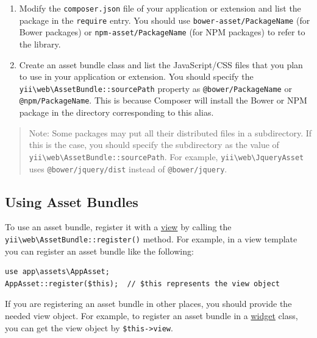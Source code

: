 \begin{enumerate}
\item Modify the \lstinline|composer.json| file of your application or extension and list the package in the \lstinline|require| entry.
You should use \lstinline|bower-asset/PackageName| (for Bower packages) or \lstinline|npm-asset/PackageName| (for NPM packages)
to refer to the library.
\item Create an asset bundle class and list the JavaScript/CSS files that you plan to use in your application or extension.
You should specify the \texttt{yii{\allowbreak{}\textbackslash}web{\allowbreak{}\textbackslash}AssetBundle\allowbreak{}::\allowbreak{}sourcePath} property as \lstinline|@bower/PackageName| or \lstinline|@npm/PackageName|.
This is because Composer will install the Bower or NPM package in the directory corresponding to this alias.
\end{enumerate}
\begin{quote}Note: Some packages may put all their distributed files in a subdirectory. If this is the case, you should specify
  the subdirectory as the value of \texttt{yii{\allowbreak{}\textbackslash}web{\allowbreak{}\textbackslash}AssetBundle\allowbreak{}::\allowbreak{}sourcePath}. For example, \texttt{yii{\allowbreak{}\textbackslash}web{\allowbreak{}\textbackslash}JqueryAsset}
  uses \lstinline|@bower/jquery/dist| instead of \lstinline|@bower/jquery|.

\end{quote}
\subsection{Using Asset Bundles \label{structure-assets.md::using-asset-bundles}}
To use an asset bundle, register it with a \hyperref[structure-views.md]{view} by calling the \texttt{yii{\allowbreak{}\textbackslash}web{\allowbreak{}\textbackslash}AssetBundle\allowbreak{}::\allowbreak{}register()}
method. For example, in a view template you can register an asset bundle like the following:

\lstset{language=php}\begin{lstlisting}
use app\assets\AppAsset;
AppAsset::register($this);  // $this represents the view object
\end{lstlisting}
If you are registering an asset bundle in other places, you should provide the needed view object. For example,
to register an asset bundle in a \hyperref[structure-widgets.md]{widget} class, you can get the view object by \lstinline|$this->view|.

